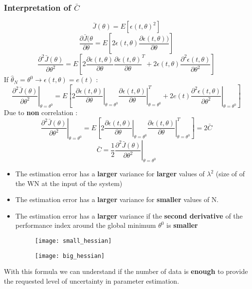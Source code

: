 \subsubsection{Interpretation of $\bar{C}$}
$$\bar{J}(\theta) = E[\epsilon(t,\theta)^2]$$
$$ \frac{\partial{\bar{J}(\theta}}{\partial{\theta}}=E \left[ 2\epsilon(t,\theta)\frac{\partial{\epsilon(t,\theta)})}{\partial{\theta}}\right] $$
$$ \frac{\partial^2{\bar{J}(\theta)}}{\partial{\theta^2}}=E \left[ 2\frac{\partial{\epsilon(t,\theta)}}{\partial{\theta}}\frac{\partial{\epsilon(t,\theta)}}{\partial{\theta}}^T + 2\epsilon(t,\theta)\frac{\partial^2{\epsilon(t,\theta)}}{\partial{\theta^2}}\right] $$
If $\hat{\theta}_N = \theta ^0 \to \epsilon(t,\theta) = e(t)$ :
$$ \left. \frac{\partial^2{\bar{J}(\theta)}}{\partial{\theta^2}} \right|_{\theta=\theta^0}=E \left[ \left. 2\frac{\partial{\epsilon(t,\theta)}}{\partial{\theta}}\right|_{\theta=\theta^0} \left. \frac{\partial{\epsilon(t,\theta)}}{\partial{\theta}}\right|^{T}_{\theta=\theta^0} + \left. 2e(t)\frac{\partial^2{\epsilon(t,\theta)}}{\partial{\theta^2}}\right|_{\theta=\theta^0} \right] $$
Due to \textbf{non} correlation :
$$ \left. \frac{\partial^2{\bar{J}(\theta)}}{\partial{\theta^2}} \right|_{\theta=\theta^0}=E \left[ \left. 2\frac{\partial{\epsilon(t,\theta)}}{\partial{\theta}}\right|_{\theta=\theta^0} \left. \frac{\partial{\epsilon(t,\theta)}}{\partial{\theta}}\right|^{T}_{\theta=\theta^0} \right] =2\bar{C} $$
\[
\boxed{\bar{C} = \frac{1}{2}\left. \frac{\partial^2{\bar{J}(\theta)}}{\partial{\theta^2}} \right|_{\theta=\theta^0}}
\]
\begin{itemize}
\item The estimation error has a \textbf{larger} variance for \textbf{larger} values of $\lambda^2$ (size of of the WN at the input of the system)
\item The estimation error has a \textbf{larger} variance for \textbf{smaller} values of N.
\item The estimation error  has a \textbf{larger } variance if the \textbf{second derivative} of the performance index around the global minimum $\theta^0$ is \textbf{smaller}
\begin{figure}[!h]
\begin{minipage}{.5\textwidth}
 \centering
  \texttt{[image: small\_hessian]}
\end{minipage}%
	\begin{minipage}{.5\textwidth}
  \centering
  \texttt{[image: big\_hessian]}
\end{minipage}%
\end{figure}
\end{itemize}
With this formula we can understand if the number of data is \textbf{enough} to provide the requested level of uncertainty in parameter estimation.

